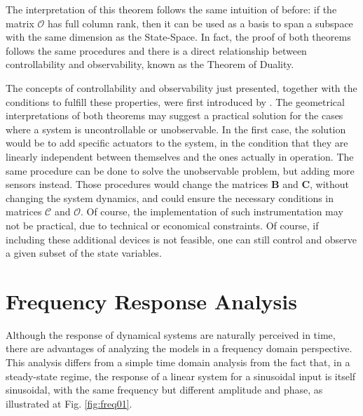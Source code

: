 \documentclass[a4paper,11pt]{book}
\numberwithin{figure}{chapter}
\numberwithin{equation}{chapter}
\numberwithin{table}{chapter}
\theoremstyle{definition}
\begin{document}
The interpretation of this theorem follows the same intuition of before: if the matrix $\bm{\mathcal{O}}$ has full column rank, then it can be used as a basis to span a subspace with the same dimension as the State-Space. In fact, the proof of both theorems follows the same procedures and there is a direct relationship between controllability and observability, known as the Theorem of Duality.

The concepts of controllability and observability just presented, together with the conditions to fulfill these properties, were first introduced by \cite{Kalman:1960}. The geometrical interpretations of both theorems may suggest a practical solution for the cases where a system is uncontrollable or unobservable. In the first case, the solution would be to add specific actuators to the system, in the condition that they are linearly independent between themselves and the ones actually in operation. The same procedure can be done to solve the unobservable problem, but adding more sensors instead. Those procedures would change the matrices $\bm{B}$ and $\bm{C}$, without changing the system dynamics, and could ensure the necessary conditions in matrices $\bm{\mathcal{C}}$ and $\bm{\mathcal{O}}$. Of course, the implementation of such instrumentation may not be practical, due to technical or economical constraints. Of course, if including these additional devices is not feasible, one can still control and observe a given subset of the state variables.

\section{Frequency Response Analysis}

Although the response of dynamical systems are naturally perceived in time, there are advantages of analyzing the models in a frequency domain perspective. This analysis differs from a simple time domain analysis from the fact that, in a steady-state regime, the response of a linear system for a sinusoidal input is itself sinusoidal, with the same frequency but different amplitude and phase, as illustrated at Fig. \ref{fig:freq01}.
\end{document}
